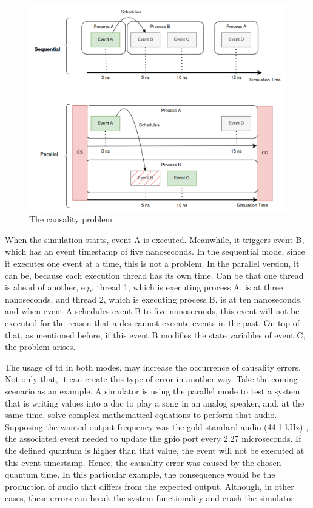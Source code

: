 \begin{figure}[H]
	\centering
 	\includegraphics[width=0.8\linewidth]{Images/CausalityError.png}
 	\caption{The causality problem}
	 \label{fig_causalityError}
\end{figure}

When the simulation starts, event A is executed. Meanwhile, it triggers event B, which has an event timestamp of five nanoseconds. In the sequential mode, since it executes one event at a time, this is not a problem. In the parallel version, it can be, because each execution thread has its own time. Can be that one thread is ahead of another, e.g. thread 1, which is executing process A, is at three nanoseconds, and thread 2, which is executing process B, is at ten nanoseconds, and when event A schedules event B to five nanoseconds, this event will not be executed for the reason that a \gls{des} cannot execute events in the past. On top of that, as mentioned before, if this event B modifies the state variables of event C, the problem arises. 

The usage of \gls{td} in both modes, may increase the occurrence of causality errors. Not only that, it can create this type of error in another way. Take the coming scenario as an example. A simulator is using the parallel mode to test a system that is writing values into a \gls{dac} to play a song in an analog speaker, and, at the same time, solve complex mathematical equations to perform that audio. Supposing the wanted output frequency was the gold standard audio (44.1 kHz) \cite{audio}, the associated event needed to update the \gls{gpio} port every 2.27 microseconds. If the defined quantum is higher than that value, the event will not be executed at this event timestamp. Hence, the causality error was caused by the chosen quantum time. In this particular example, the consequence would be the production of audio that differs from the expected output. Although, in other cases, these errors can break the system functionality and crash the simulator. 

